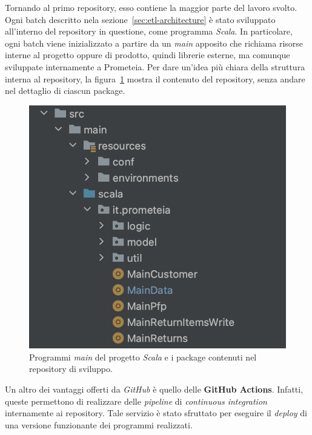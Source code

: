 Tornando al primo repository, esso contiene la maggior parte del lavoro svolto.
Ogni batch descritto nela sezione~\ref{sec:etl-architecture} è stato sviluppato all'interno del repository in questione, come programma \textit{Scala}.
In particolare, ogni batch viene inizializzato a partire da un \textit{main} apposito che richiama risorse interne al progetto oppure di prodotto, quindi librerie esterne, ma comunque sviluppate internamente a Prometeia.
Per dare un'idea più chiara della struttura interna al repository, la figura~\ref{fig:packages-structure} mostra il contenuto del repository, senza andare nel dettaglio di ciascun package.
\begin{figure}
    \includegraphics[width=.6\textwidth]{img/packages-structure.png}
    \centering
    \caption{Programmi \textit{main} del progetto \textit{Scala} e i package contenuti nel repository di sviluppo.}
    \label{fig:packages-structure}
\end{figure}
Un altro dei vantaggi offerti da \textit{GitHub} è quello delle \textbf{GitHub Actions}.
Infatti, queste permettono di realizzare delle \textit{pipeline} di \textit{continuous integration} internamente ai repository.
Tale servizio è stato sfruttato per eseguire il \textit{deploy} di una versione funzionante dei programmi realizzati.

